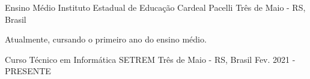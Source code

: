 
\begin{cventries}
	\cventry
	{Ensino Médio} %
	{Instituto Estadual de Educação Cardeal Pacelli} %
	{Três de Maio - RS, Brasil} %
	{} %
	{
		\begin{cvitems} %
			\item {Atualmente, cursando o primeiro ano do ensino médio.}
		\end{cvitems}
	}

	\cventry
	{Curso Técnico em Informática} %
	{SETREM} %
	{Três de Maio - RS, Brasil} %
	{Fev. 2021 - PRESENTE} %
	{
	}
\end{cventries}
